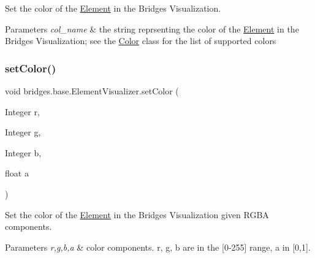 Set the color of the \mbox{\hyperlink{classbridges_1_1base_1_1_element}{Element}} in the Bridges Visualization. 


\begin{DoxyParams}{Parameters}
{\em col\+\_\+name} & the string reprsenting the color of the \mbox{\hyperlink{classbridges_1_1base_1_1_element}{Element}} in the Bridges Visualization; see the \mbox{\hyperlink{classbridges_1_1base_1_1_color}{Color}} class for the list of supported colors \\
\hline
\end{DoxyParams}
\mbox{\label{classbridges_1_1base_1_1_element_visualizer_a84fad1c8abe43b20c68c1800d7630918}} 
\subsubsection{\texorpdfstring{setColor()}{setColor()}\hspace{0.1cm}{\footnotesize\ttfamily [2/3]}}
{\footnotesize\ttfamily void bridges.\+base.\+Element\+Visualizer.\+set\+Color (\begin{DoxyParamCaption}\item[{Integer}]{r,  }\item[{Integer}]{g,  }\item[{Integer}]{b,  }\item[{float}]{a }\end{DoxyParamCaption})}



Set the color of the \mbox{\hyperlink{classbridges_1_1base_1_1_element}{Element}} in the Bridges Visualization given R\+G\+BA components. 


\begin{DoxyParams}{Parameters}
{\em r,g,b,a} & color components. r, g, b are in the \mbox{[}0-\/255\mbox{]} range, a in \mbox{[}0,1\mbox{]}. \\
\hline
\end{DoxyParams}
\mbox{\label{classbridges_1_1base_1_1_element_visualizer_a33172ab908f3b6f9740727b0bfe91565}} 
